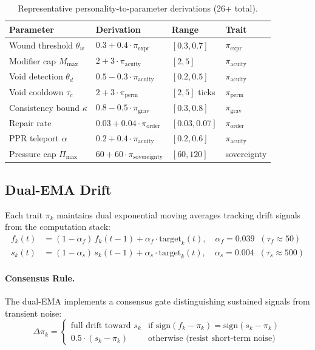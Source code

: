 \documentclass[11pt]{article}
\begin{document}
\begin{table}[H]
\centering
\small
\caption{Representative personality-to-parameter derivations (26+ total).}
\label{tab:personality-params}
\begin{tabular}{llll}
\toprule
\textbf{Parameter} & \textbf{Derivation} & \textbf{Range} & \textbf{Trait} \\
\midrule
Wound threshold $\theta_w$ & $0.3 + 0.4 \cdot \pi_{\text{expr}}$ & $[0.3, 0.7]$ & $\pi_{\text{expr}}$ \\
Modifier cap $M_{\max}$ & $2 + 3 \cdot \pi_{\text{acuity}}$ & $[2, 5]$ & $\pi_{\text{acuity}}$ \\
Void detection $\theta_d$ & $0.5 - 0.3 \cdot \pi_{\text{acuity}}$ & $[0.2, 0.5]$ & $\pi_{\text{acuity}}$ \\
Void cooldown $\tau_c$ & $2 + 3 \cdot \pi_{\text{perm}}$ & $[2, 5]$ ticks & $\pi_{\text{perm}}$ \\
Consistency bound $\kappa$ & $0.8 - 0.5 \cdot \pi_{\text{grav}}$ & $[0.3, 0.8]$ & $\pi_{\text{grav}}$ \\
Repair rate & $0.03 + 0.04 \cdot \pi_{\text{order}}$ & $[0.03, 0.07]$ & $\pi_{\text{order}}$ \\
PPR teleport $\alpha$ & $0.2 + 0.4 \cdot \pi_{\text{acuity}}$ & $[0.2, 0.6]$ & $\pi_{\text{acuity}}$ \\
Pressure cap $\Pi_{\max}$ & $60 + 60 \cdot \pi_{\text{sovereignty}}$ & $[60, 120]$ & sovereignty \\
\bottomrule
\end{tabular}
\end{table}

\subsection{Dual-EMA Drift}

Each trait $\pi_k$ maintains dual exponential moving averages tracking drift signals from the computation stack:
\begin{align}
f_k(t) &= (1 - \alpha_f)\, f_k(t-1) + \alpha_f \cdot \text{target}_k(t), \quad \alpha_f = 0.039 \;\;(\tau_f \approx 50) \\
s_k(t) &= (1 - \alpha_s)\, s_k(t-1) + \alpha_s \cdot \text{target}_k(t), \quad \alpha_s = 0.004 \;\;(\tau_s \approx 500)
\end{align}

\paragraph{Consensus Rule.}
The dual-EMA implements a consensus gate distinguishing sustained signals from transient noise:
\begin{equation}
\Delta\pi_k = \begin{cases}
\text{full drift toward } s_k & \text{if } \text{sign}(f_k - \pi_k) = \text{sign}(s_k - \pi_k) \\
0.5 \cdot (s_k - \pi_k) & \text{otherwise (resist short-term noise)}
\end{cases}
\end{equation}
\end{document}
